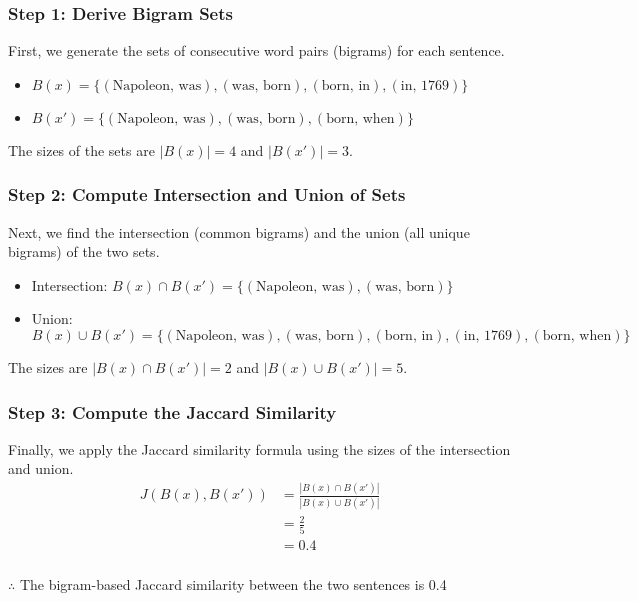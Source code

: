 \documentclass{article}
\begin{document}
\subsubsection*{Step 1: Derive Bigram Sets}
\parbox{\textwidth}{
First, we generate the sets of consecutive word pairs (bigrams) for each sentence.
\begin{itemize}
    \item $B(x) = \{(\text{Napoleon, was}), (\text{was, born}), (\text{born, in}), (\text{in, 1769})\}$
    \item $B(x') = \{(\text{Napoleon, was}), (\text{was, born}), (\text{born, when})\}$
\end{itemize}
The sizes of the sets are $|B(x)| = 4$ and $|B(x')| = 3$.
}

\subsubsection*{Step 2: Compute Intersection and Union of Sets}
\parbox{\textwidth}{
Next, we find the intersection (common bigrams) and the union (all unique bigrams) of the two sets.
\begin{itemize}
    \item Intersection: $B(x) \cap B(x') = \{(\text{Napoleon, was}), (\text{was, born})\}$
    \item Union: $B(x) \cup B(x') = \{(\text{Napoleon, was}), (\text{was, born}), (\text{born, in}), (\text{in, 1769}), (\text{born, when})\}$
\end{itemize}
The sizes are $|B(x) \cap B(x')| = 2$ and $|B(x) \cup B(x')| = 5$.
}

\subsubsection*{Step 3: Compute the Jaccard Similarity}
\parbox{\textwidth}{
Finally, we apply the Jaccard similarity formula using the sizes of the intersection and union.
\begin{align*}
    J(B(x), B(x')) &= \frac{|B(x) \cap B(x')|}{|B(x) \cup B(x')|} \\
                  &= \frac{2}{5} \\
                  &= 0.4
\end{align*}
}

\subsubsection*{\normalfont}{$\therefore$ The bigram-based Jaccard similarity between the two sentences is 0.4}
\end{document}
